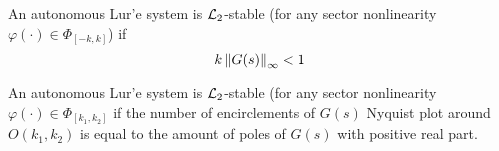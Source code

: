 \begin{theorem}
	An autonomous Lur'e system is $\mathcal{L}_2$-stable (for any sector nonlinearity $\varphi(\cdot) \in \Phi_{[-k, k]}$) if
	\[k \left\lVert G(s)\right\rVert_\infty < 1\]
\end{theorem}

\begin{theorem}
	An autonomous Lur'e system is $\mathcal{L}_2$-stable (for any sector nonlinearity $\varphi(\cdot) \in \Phi_{[k_1, k_2]}$ if the number of encirclements of $G(s)$ Nyquist plot around $O(k_1,k_2)$ is equal to the amount of poles of $G(s)$ with positive real part.
\end{theorem}
